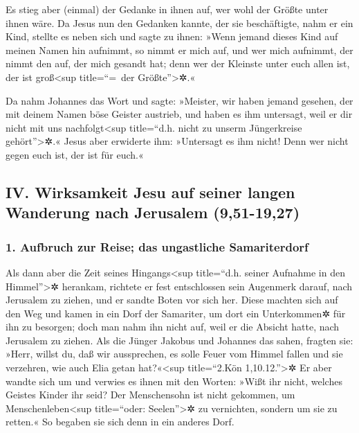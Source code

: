  Es stieg aber (einmal) der Gedanke in ihnen auf, wer
wohl der Größte unter ihnen wäre.  Da Jesus nun den
Gedanken kannte, der sie beschäftigte, nahm er ein Kind, stellte es
neben sich  und sagte zu ihnen: »Wenn jemand dieses Kind
auf meinen Namen hin aufnimmt, so nimmt er mich auf, und wer mich
aufnimmt, der nimmt den auf, der mich gesandt hat; denn wer der Kleinste
unter euch allen ist, der ist groß\textless sup title=``=~der
Größte''\textgreater✲.«

 Da nahm Johannes das Wort und sagte: »Meister, wir haben
jemand gesehen, der mit deinem Namen böse Geister austrieb, und haben es
ihm untersagt, weil er dir nicht mit uns nachfolgt\textless sup
title=``d.h. nicht zu unserm Jüngerkreise gehört''\textgreater✲.«
 Jesus aber erwiderte ihm: »Untersagt es ihm nicht! Denn
wer nicht gegen euch ist, der ist für euch.«

\hypertarget{iv.-wirksamkeit-jesu-auf-seiner-langen-wanderung-nach-jerusalem-951-1927}{%
\subsection{IV. Wirksamkeit Jesu auf seiner langen Wanderung nach
Jerusalem
(9,51-19,27)}\label{iv.-wirksamkeit-jesu-auf-seiner-langen-wanderung-nach-jerusalem-951-1927}}

\hypertarget{aufbruch-zur-reise-das-ungastliche-samariterdorf}{%
\subsubsection{1. Aufbruch zur Reise; das ungastliche
Samariterdorf}\label{aufbruch-zur-reise-das-ungastliche-samariterdorf}}

 Als dann aber die Zeit seines Hingangs\textless sup
title=``d.h. seiner Aufnahme in den Himmel''\textgreater✲ herankam,
richtete er fest entschlossen sein Augenmerk darauf, nach Jerusalem zu
ziehen,  und er sandte Boten vor sich her. Diese machten
sich auf den Weg und kamen in ein Dorf der Samariter, um dort ein
Unterkommen✲ für ihn zu besorgen;  doch man nahm ihn
nicht auf, weil er die Absicht hatte, nach Jerusalem zu ziehen.
 Als die Jünger Jakobus und Johannes das sahen, fragten
sie: »Herr, willst du, daß wir aussprechen, es solle Feuer vom Himmel
fallen und sie verzehren, wie auch Elia getan hat?«\textless sup
title=``2.Kön 1,10.12.''\textgreater✲  Er aber wandte
sich um und verwies es ihnen mit den Worten: »Wißt ihr nicht, welches
Geistes Kinder ihr seid? Der Menschensohn ist nicht gekommen, um
Menschenleben\textless sup title=``oder: Seelen''\textgreater✲ zu
vernichten, sondern um sie zu retten.«  So begaben sie
sich denn in ein anderes Dorf.

